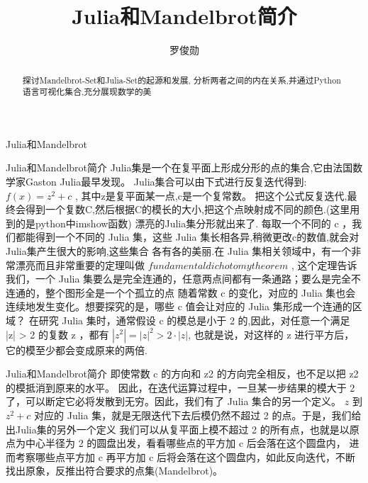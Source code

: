 \documentclass{beamer}
\title{Julia和Mandelbrot简介}
\author{罗俊勋}
\institute{浙江大学}
\begin{document}
	\titlepage
	\begin{frame}{Julia和Mandelbrot}{}
    \begin{abstract}
      探讨Mandelbrot-Set和Julia-Set的起源和发展,
      分析两者之间的内在关系,并通过Python语言可视化集合,充分展现数学的美
  \end{abstract}

\end{frame}


\begin{frame}{Julia和Mandelbrot简介}
  Julia集是一个在复平面上形成分形的点的集合,它由法国数学家Gaston Julia最早发现。\cite{first}
  Julia集合可以由下式进行反复迭代得到:$f(x) = z^2 + c$
  , 其中z是复平面某一点,c是一个复常数。
  把这个公式反复迭代,最终会得到一个复数C,然后根据C的模长的大小,把这个点映射成不同的颜色.(这里用到的是python中imshow函数)
  漂亮的Julia集分形就出来了.
  每取一个不同的 c ，我们都能得到一个不同的 Julia 集，这些 Julia 集长相各异,稍微更改c的数值,就会对Julia集产生很大的影响,这些集合
  各有各的美丽.在 Julia 集相关领域中，有一个非常漂亮而且非常重要的定理叫做 $fundamental dichotomy theorem$ ,
  这个定理告诉我们，一个 Julia 集要么是完全连通的，任意两点间都有一条通路；要么是完全不连通的，整个图形全是一个个孤立的点
  随着常数 c 的变化，对应的 Julia 集也会连续地发生变化。想要探究的是，哪些 c 值会让对应的 Julia 集形成一个连通的区域？
  在研究 Julia 集时，通常假设 c 的模总是小于 2 的,因此，对任意一个满足 |z| > 2 的复数 z ，都有 $|z^2| = {|z|}^2 > 2·|z| $,
  也就是说，对这样的 z 进行平方后，它的模至少都会变成原来的两倍.
\end{frame}

\begin{frame}{Julia和Mandelbrot简介}
	即使常数 c 的方向和 z2 的方向完全相反，也不足以把 z2 的模抵消到原来的水平。
  因此，在迭代运算过程中，一旦某一步结果的模大于 2 了，可以断定它必将发散到无穷。因此，我们有了 Julia 集合的另一个定义。
   $z$ 到 $z^2 + c$ 对应的 Julia 集，就是无限迭代下去后模仍然不超过 2 的点。于是，我们给出Julia集的另外一个定义
   我们可以从复平面上模不超过 2 的所有点，也就是以原点为中心半径为 2 的圆盘出发，看看哪些点的平方加 c 后会落在这个圆盘内，
   进而考察哪些点平方加 c 再平方加 c 后将会落在这个圆盘内，如此反向迭代，不断找出原象，反推出符合要求的点集(Mandelbrot)。
   \cite{second}
\end{frame}
\end{document}
